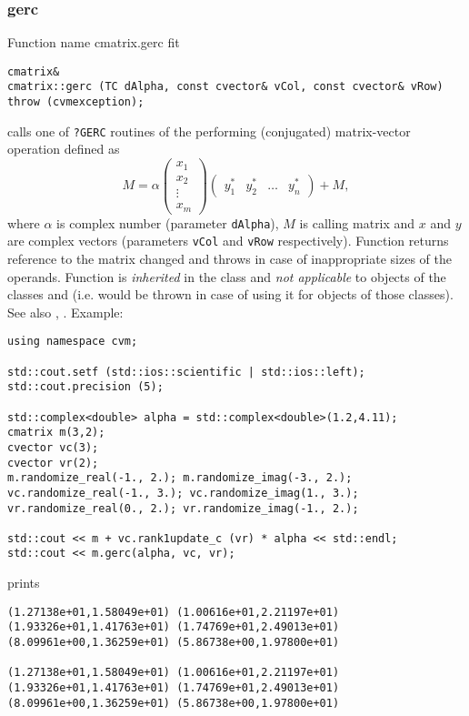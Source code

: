 \subsubsection{gerc}
Function%
\pdfdest name {cmatrix.gerc} fit
\begin{verbatim}
cmatrix&
cmatrix::gerc (TC dAlpha, const cvector& vCol, const cvector& vRow)
throw (cvmexception);
\end{verbatim}
calls one of \verb"?GERC" routines of the
performing  
(conjugated)
matrix-vector operation defined as
\begin{equation*}
M=\alpha\begin{pmatrix}
x_1 \\
x_2 \\
\vdots \\
x_m
\end{pmatrix}
\begin{pmatrix}
y_1^* & y_2^* & \hdots & y_n^*
\end{pmatrix} + M,
\end{equation*}
where $\alpha$ is  complex number
(parameter \verb"dAlpha"),
$M$ is  calling matrix
and $x$ and $y$ are complex vectors (parameters \verb"vCol"
and \verb"vRow" respectively).
Function
returns  reference to the matrix changed and throws
in case of inappropriate sizes of the operands.
Function is \emph{inherited} in the class
 and
\emph{not applicable} to objects of the classes
 and
 (i.e.  would be thrown
in case of using it for objects of those classes).
See also
,
.
Example:
\begin{Verbatim}
using namespace cvm;

std::cout.setf (std::ios::scientific | std::ios::left); 
std::cout.precision (5);

std::complex<double> alpha = std::complex<double>(1.2,4.11);
cmatrix m(3,2);
cvector vc(3);
cvector vr(2);
m.randomize_real(-1., 2.); m.randomize_imag(-3., 2.);
vc.randomize_real(-1., 3.); vc.randomize_imag(1., 3.); 
vr.randomize_real(0., 2.); vr.randomize_imag(-1., 2.); 

std::cout << m + vc.rank1update_c (vr) * alpha << std::endl;
std::cout << m.gerc(alpha, vc, vr);
\end{Verbatim}
prints
\begin{Verbatim}
(1.27138e+01,1.58049e+01) (1.00616e+01,2.21197e+01)
(1.93326e+01,1.41763e+01) (1.74769e+01,2.49013e+01)
(8.09961e+00,1.36259e+01) (5.86738e+00,1.97800e+01)

(1.27138e+01,1.58049e+01) (1.00616e+01,2.21197e+01)
(1.93326e+01,1.41763e+01) (1.74769e+01,2.49013e+01)
(8.09961e+00,1.36259e+01) (5.86738e+00,1.97800e+01)
\end{Verbatim}
\newpage



